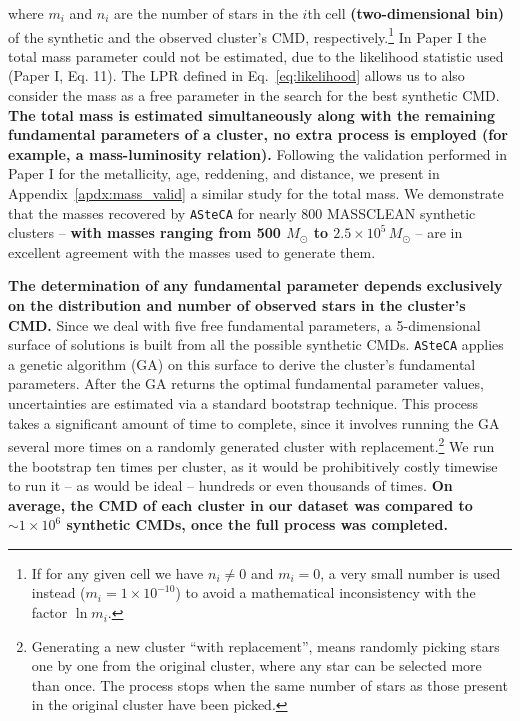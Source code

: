 \documentclass[referee]{aa}
\begin{document}
\noindent where $m_i$ and $n_i$ are the number of stars in the $i$th cell
\textbf{(two-dimensional bin)} of the synthetic and the observed cluster's CMD,
respectively.\footnote{If for any given cell we have $n_i\neq0$ and $m_i=0$, a
very small number is used instead ($m_i=1{\times}10^{-10}$) to avoid a
mathematical inconsistency with the factor $\ln m_i$.}
%
In Paper I the total mass parameter could not be estimated, due to the
likelihood statistic used (Paper I, Eq. 11). The LPR defined in
Eq.~\ref{eq:likelihood} allows us to also consider the mass as a free parameter
in the search for the best synthetic CMD.\@
%
\textbf{The total mass is estimated simultaneously along with the remaining
fundamental parameters of a cluster, no extra process is employed (for example,
a mass-luminosity relation).}
%
Following the validation performed in Paper I for the metallicity, age,
reddening, and distance, we present in Appendix~\ref{apdx:mass_valid} a
similar study for the total mass. We demonstrate that the masses recovered by
\texttt{ASteCA} for nearly 800 MASSCLEAN synthetic clusters -- \textbf{with
masses ranging from 500 $M_{\odot}$ to $2.5\times10^5\,M_{\odot}$} -- are in
excellent agreement with the masses used to generate them.

\textbf{The determination of any fundamental parameter depends exclusively on
the distribution and number of observed stars in the cluster's CMD.}
Since we deal with five free fundamental parameters, a 5-dimensional surface of
solutions is built from all the possible synthetic CMDs.
\texttt{ASteCA} applies a genetic algorithm (GA) on this surface to derive the
cluster's fundamental parameters.
%
%
After the GA returns the optimal fundamental parameter values, uncertainties are
estimated via a standard bootstrap technique. This process takes a significant
amount of time to complete, since it involves running the GA several more times
on a randomly generated cluster with replacement.\footnote{Generating a new
cluster ``with replacement'', means randomly picking stars one by one from the
original cluster, where any star can be selected more than once. The process
stops when the same number of stars as those present in the original cluster
have been picked.}
We run the bootstrap ten times per cluster, as it would be prohibitively
costly timewise to run it -- as would be ideal -- hundreds or even thousands of
times.
\textbf{On average, the CMD of each cluster in our dataset was compared to
${\sim}1{\times}10^6$ synthetic CMDs, once the full process was completed.}
\end{document}
